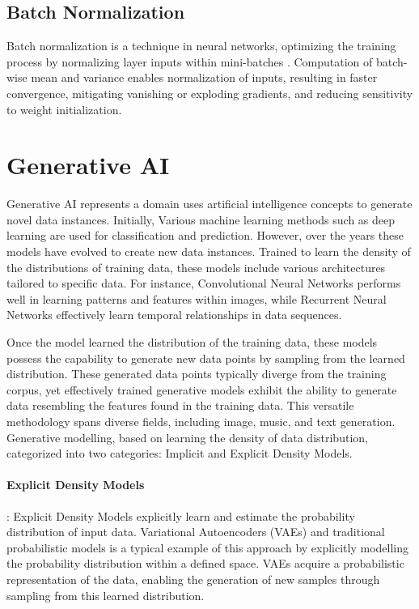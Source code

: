 \documentclass[12pt,twoside,a4paper,parskip]{scrbook} %
\begin{document}
\subsection{Batch Normalization}
Batch normalization is a technique in neural networks, optimizing the training process by normalizing layer inputs within mini-batches \cite{batch}. Computation of batch-wise mean and variance enables normalization of inputs, resulting in faster convergence, mitigating vanishing or exploding gradients, and reducing sensitivity to weight initialization.


\section{Generative AI}
Generative AI represents a domain uses artificial intelligence concepts to generate novel data instances. Initially, Various machine learning methods such as deep learning are used for classification and prediction. However, over the years these models have evolved to create new data instances. Trained to learn the density of the distributions of training data, these models include various architectures tailored to specific data. For instance, Convolutional Neural Networks performs well in learning patterns and features within images, while Recurrent Neural Networks effectively learn temporal relationships in data sequences.


Once the model learned the distribution of the training data, these models possess the capability to generate new data points by sampling from the learned distribution. These generated data points typically diverge from the training corpus, yet effectively trained generative models exhibit the ability to generate data resembling the features found in the training data. This versatile methodology spans diverse fields, including image, music, and text generation. Generative modelling, based on learning the density of data distribution, categorized into two categories: Implicit and Explicit Density Models.

\paragraph*{Explicit Density Models}:
Explicit Density Models explicitly learn and estimate the probability distribution of input data. Variational Autoencoders (VAEs) \cite{vae} and traditional probabilistic models is a typical example of this approach by explicitly modelling the probability distribution within a defined space. VAEs acquire a probabilistic representation of the data, enabling the generation of new samples through sampling from this learned distribution.
\end{document}
